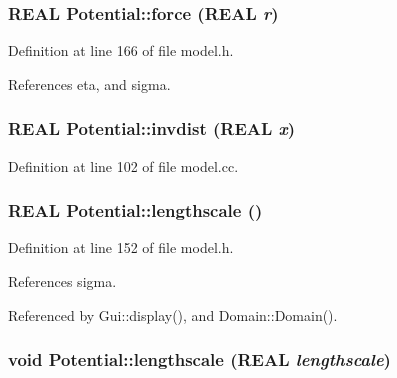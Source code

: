 \hypertarget{namespacePotential_3e887e85d927abdab55e33b9a1b5f9a9}{
\subsubsection[{force}]{\setlength{\rightskip}{0pt plus 5cm}REAL Potential::force (REAL {\em r})}}
\label{namespacePotential_3e887e85d927abdab55e33b9a1b5f9a9}




Definition at line 166 of file model.h.

References eta, and sigma.\hypertarget{namespacePotential_918dd94d2cedd4fe3ca3fa920b6d7fef}{
\subsubsection[{invdist}]{\setlength{\rightskip}{0pt plus 5cm}REAL Potential::invdist (REAL {\em x})}}
\label{namespacePotential_918dd94d2cedd4fe3ca3fa920b6d7fef}




Definition at line 102 of file model.cc.\hypertarget{namespacePotential_97fea8d42e4e224a7f7aba10ef59a9ad}{
\subsubsection[{lengthscale}]{\setlength{\rightskip}{0pt plus 5cm}REAL Potential::lengthscale ()}}
\label{namespacePotential_97fea8d42e4e224a7f7aba10ef59a9ad}




Definition at line 152 of file model.h.

References sigma.

Referenced by Gui::display(), and Domain::Domain().\hypertarget{namespacePotential_cd514cd5456126aec5806df5bf4c606d}{
\subsubsection[{lengthscale}]{\setlength{\rightskip}{0pt plus 5cm}void Potential::lengthscale (REAL {\em lengthscale})}}
\label{namespacePotential_cd514cd5456126aec5806df5bf4c606d}




